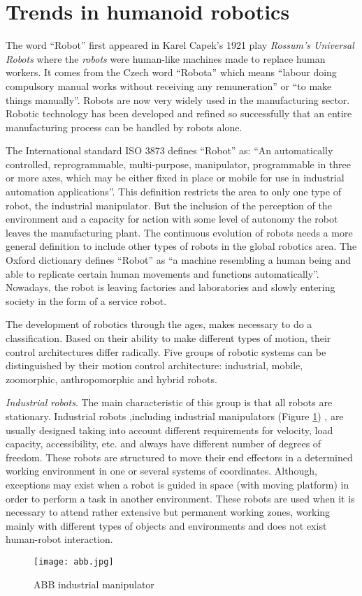 \section{Trends in humanoid robotics}

The word ``Robot'' first appeared in Karel Capek's 1921 play \textit{Rossum's Universal Robots} where the \textit{robots} were human-like machines made to replace human workers. It comes from the Czech word ``Robota'' which means ``labour doing compulsory manual works without receiving any remuneration'' or ``to make things manually''. Robots are now very widely used in the manufacturing sector. Robotic technology has been developed and refined so successfully that an entire manufacturing process can be handled by robots alone.

The International standard ISO 3873 defines ``Robot'' as: ``An automatically controlled, reprogrammable, multi-purpose, manipulator, programmable in three or more axes, which may be either fixed in place or mobile for use in industrial automation applications''. This definition restricts the area to only one type of robot, the industrial manipulator. But the inclusion of the perception of the environment and a capacity for action with some level of autonomy the robot leaves the manufacturing plant. The continuous evolution of robots needs a more general definition to include other types of robots in the global robotics area. The Oxford dictionary defines ``Robot'' as ``a machine resembling a human being and able to replicate certain human movements and functions automatically''. Nowadays, the robot is leaving factories and laboratories and slowly entering society in the form of a service robot.

The development of robotics through the ages, makes necessary to do a classification. Based on their ability to make different types of motion, their control architectures differ radically. Five groups of robotic systems can be distinguished by their motion control architecture: industrial, mobile, zoomorphic, anthropomorphic and hybrid robots.

\textit{Industrial robots}. The main characteristic of this group is that all robots are stationary. Industrial robots ,including industrial manipulators (Figure \ref{fig:abb}) , are usually designed taking into account different requirements for velocity, load capacity, accessibility, etc. and always have different number of degrees of freedom. These robots are structured to move their end effectors in a determined working environment in one or several systems of coordinates. Although, exceptions may exist when a robot is guided in space (with moving platform) in order to perform a task in another environment. These robots are used when it is necessary to attend rather extensive but permanent working zones, working mainly with different types of objects and environments and does not exist human-robot interaction.
\begin{figure}[!hbt]
\centering
\texttt{[image: abb.jpg]}
\caption{ABB industrial manipulator}
\label{fig:abb}
\end{figure}
 
